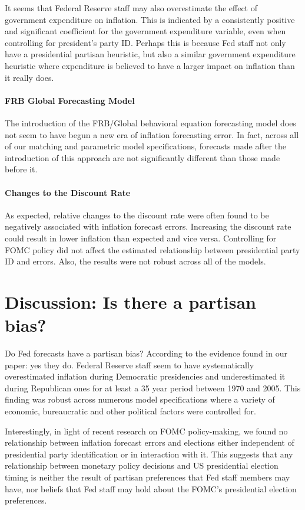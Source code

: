 \documentclass[a4paper]{article}\usepackage{graphicx, color}
\begin{document}
It seems that Federal Reserve staff may also overestimate the effect of government expenditure on inflation. This is indicated by a consistently positive and significant coefficient for the government expenditure variable, even when controlling for president's party ID. Perhaps this is because Fed staff not only have a presidential partisan heuristic, but also a similar government expenditure heuristic where expenditure is believed to have a larger impact on inflation than it really does.

\paragraph{FRB Global Forecasting Model}

The introduction of the FRB/Global behavioral equation forecasting model does not seem to have begun a new era of inflation forecasting error. In fact, across all of our matching and parametric model specifications, forecasts made after the introduction of this approach are not significantly different than those made before it. 

\paragraph{Changes to the Discount Rate}

As expected, relative changes to the discount rate were often found to be negatively associated with inflation forecast errors. Increasing the discount rate could result in lower inflation than expected and vice versa. Controlling for FOMC policy did not affect the estimated relationship between presidential party ID and errors. Also, the results were not robust across all of the models. 

\section*{Discussion: Is there a partisan bias?}

Do Fed forecasts have a partisan bias? According to the evidence found in our paper: yes they do. Federal Reserve staff seem to have systematically overestimated inflation during Democratic presidencies and underestimated it during Republican ones for at least a 35 year period between 1970 and 2005. This finding was robust across numerous model specifications where a variety of economic, bureaucratic and other political factors were controlled for. 

Interestingly, in light of recent research on FOMC policy-making, we found no relationship between inflation forecast errors and elections either independent of presidential party identification or in interaction with it. This suggests that any relationship between monetary policy decisions and US presidential election timing is neither the result of partisan preferences that Fed staff members may have, nor beliefs that Fed staff may hold about the FOMC's presidential election preferences. 
\end{document}
